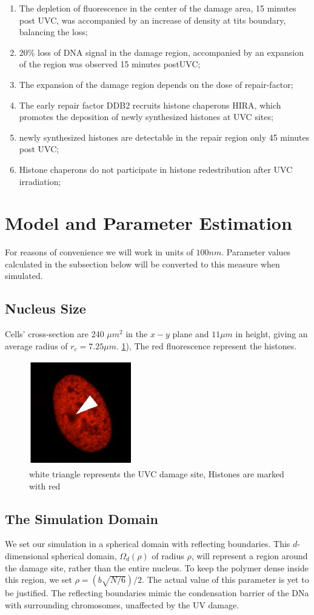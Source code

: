 \documentclass[12pt]{report}
\begin{document}
\begin{enumerate}
		\item The depletion of fluorescence in the center of the damage area, 15 minutes post UVC, was accompanied by an increase of density at tits boundary, balancing the loss;
		\item 20\% loss of DNA signal in the damage region, accompanied by an expansion of the region was observed 15 minutes postUVC;
		\item The expansion of the damage region depends on the dose of repair-factor;		
		\item The early repair factor DDB2 recruits histone chaperons HIRA, which promotes the deposition of newly synthesized histones at UVC sites;
		\item newly synthesized histones are detectable in the repair region only 45 minutes post UVC;
		\item Histone chaperons do not participate in histone redestribution after UVC irradiation;
		
	\end{enumerate}
	
	\section{Model and Parameter Estimation}
	For reasons of convenience we will work in units of $100 nm$. Parameter values calculated in the subsection below will be converted to this measure when simulated. 
	
	\subsection{Nucleus Size}
	 Cells' cross-section are 240 $\mu m^2$ in the $x-y$ plane and $11 \mu m$ in height, giving an average radius of $r_c=7.25 \mu m$.  \ref{fig:histoneMarkBeforeDamage}), The red fluorescence represent the histones.
		\begin{figure}[H]
			\centering
			\includegraphics[width=0.2\linewidth]{../histoneMarkBeforeDamage}
			\caption{white triangle represents the UVC damage site, Histones are marked with red}
			\label{fig:histoneMarkBeforeDamage}
		\end{figure}
		
	\subsection{The Simulation Domain}
	We set our simulation in a spherical domain with reflecting boundaries. This $d$-dimensional spherical domain, $\Omega_d(\rho)$ of radius $\rho$, will represent a region around the damage site, rather than the entire nucleus. 
	To keep the polymer dense inside this region, we set $\rho=(b\sqrt{N/6})/2$. The actual value of this parameter is yet to be justified. The reflecting boundaries mimic the condensation barrier of the DNa with surrounding chromosomes, unaffected by the UV damage. 
	
\end{document}
